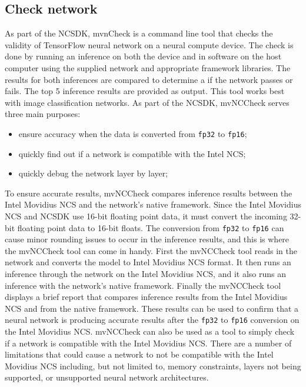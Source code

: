 \subsection{Check network}
\label{subsect:mvnCCheck} 
As part of the NCSDK, mvnCheck is a command line tool that checks the validity 
of TensorFlow neural network on a neural compute device.
The check is done by running an inference on both the device and in software on
the host computer using the supplied network and appropriate framework
libraries.  
The results for both inferences are compared to determine a if the
network  passes or fails. The top 5 inference results are provided as output.
This tool works best with image classification networks. 
As part of the NCSDK, mvNCCheck serves three main purposes:
%
\begin{itemize} 
	\item ensure accuracy when the data is converted from \texttt{fp32} to \texttt{fp16};
	\item quickly find out if a network is compatible with the Intel NCS; 
	\item quickly debug the network layer by layer;
\end{itemize} 
%
To ensure accurate results, mvNCCheck compares inference results between the 
Intel Movidius NCS and the network’s native framework. 
Since the Intel Movidius NCS and NCSDK use 16-bit floating point data, it must 
convert the incoming 32-bit floating point data to 16-bit floats. 
The conversion from \texttt{fp32} to \texttt{fp16} can cause minor rounding issues to
occur in the inference results, and this is where the mvNCCheck tool can come in
handy. 
%
First the mvNCCheck tool reads in the network and converts the model to Intel
Movidius NCS format. It then runs an inference through the network on the Intel
Movidius NCS, and it also runs an inference with the network’s native framework.
%
Finally the mvNCCheck tool displays a brief report that compares inference
results from the Intel Movidius NCS and from the native framework. 
These results can be used to confirm that a neural network is producing accurate 
results after the \texttt{fp32} to \texttt{fp16} conversion on the Intel Movidius NCS. 
%
mvNCCheck can also be used as a tool to simply check if a network is compatible
with the Intel Movidius NCS. There are a number of limitations that could cause
a network to not be compatible with the Intel Movidius NCS including, but not
limited to, memory constraints, layers not being supported, or unsupported
neural network architectures.\\\\
